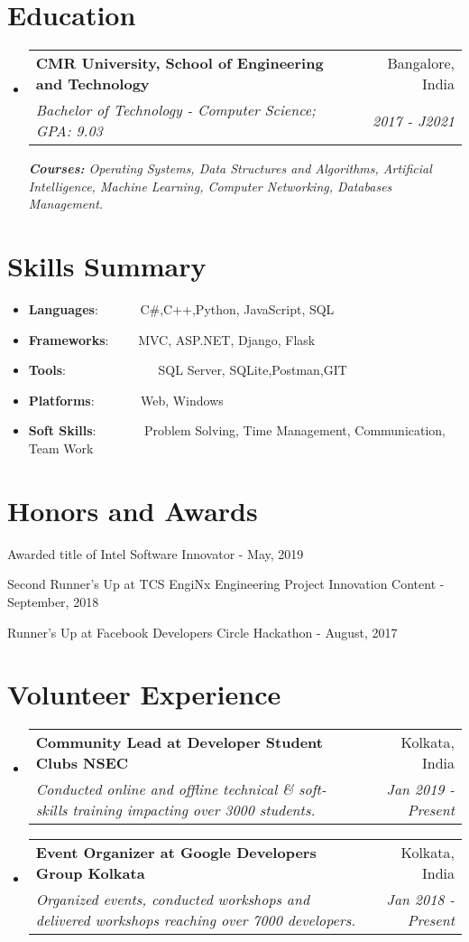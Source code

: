 \documentclass[a4paper,20pt]{article}
\makeatletter
\newcommand{\resumeItem}[2]{
  \item\small{
    \textbf{#1}{: #2 \vspace{-2pt}}
  }
}
\newcommand{\resumeSubheading}[4]{
  \vspace{-1pt}\item
    \begin{tabular*}{0.97\textwidth}{l@{\extracolsep{\fill}}r}
      \textbf{#1} & #2 \\
      \textit{#3} & \textit{#4} \\
    \end{tabular*}\vspace{-5pt}
}
\newcommand{\resumeSubItem}[2]{\resumeItem{#1}{#2}\vspace{-3pt}}
\newcommand{\resumeSubHeadingListStart}{\begin{itemize}[leftmargin=*]}
\newcommand{\resumeSubHeadingListEnd}{\end{itemize}}
\makeatother
\begin{document}
\section{Education}
  \resumeSubHeadingListStart
    \resumeSubheading
      {CMR University, School of Engineering and Technology}{Bangalore, India}
      {Bachelor of Technology - Computer Science;  GPA: 9.03}{2017 - J2021}
      {\scriptsize \textit{ \footnotesize{\newline{}\textbf{Courses:} Operating Systems, Data Structures and Algorithms, Artificial Intelligence, Machine Learning, Computer Networking, Databases Management.}}}
    \resumeSubHeadingListEnd
    
\vspace{-5pt}

\section{Skills Summary}
	\resumeSubHeadingListStart
	\resumeSubItem{Languages}{~~~~~~C\#,C++,Python, JavaScript, SQL}
	\resumeSubItem{Frameworks}{~~~~MVC, ASP.NET, Django, Flask}
	\resumeSubItem{Tools}{~~~~~~~~~~~~~~SQL Server, SQLite,Postman,GIT}
	\resumeSubItem{Platforms}{~~~~~~ Web, Windows}
	\resumeSubItem{Soft Skills}{~~~~~~~Problem Solving, Time Management, Communication, Team Work}

\resumeSubHeadingListEnd
\vspace{-5pt}
\section{Honors and Awards}
\begin{description}[font=$\bullet$]
\item {Awarded title of Intel Software Innovator - May, 2019}
\vspace{-5pt}
\item {Second Runner's Up at TCS EngiNx Engineering Project Innovation Content - September, 2018 }
\vspace{-5pt}
\item {Runner's Up at Facebook Developers Circle Hackathon - August, 2017}

\end{description}

\vspace{-5pt}
\section{Volunteer Experience}
  \resumeSubHeadingListStart
	\resumeSubheading
    {Community Lead at Developer Student Clubs NSEC}{Kolkata, India}
    {Conducted online and offline technical \& soft-skills training impacting over 3000 students.}{Jan 2019 - Present}
\vspace{5pt}
    \resumeSubheading
    {Event Organizer at Google Developers Group Kolkata}{Kolkata, India}
    {Organized events, conducted workshops and delivered workshops reaching over 7000 developers.}{Jan 2018 - Present}

\resumeSubHeadingListEnd
\end{document}
